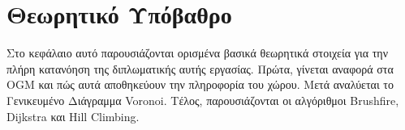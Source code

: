 \chapter{Θεωρητικό Υπόβαθρο}
\label{chapter:theory}

Στο κεφάλαιο αυτό παρουσιάζονται ορισμένα βασικά θεωρητικά στοιχεία για την πλήρη κατανόηση της διπλωματικής αυτής εργασίας. Πρώτα, γίνεται αναφορά στα OGM και πώς αυτά αποθηκεύουν την πληροφορία του χώρου. Μετά αναλύεται το Γενικευμένο Διάγραμμα Voronoi. Τέλος, παρουσιάζονται οι αλγόριθμοι Brushfire, Dijkstra και Hill Climbing. 







% 